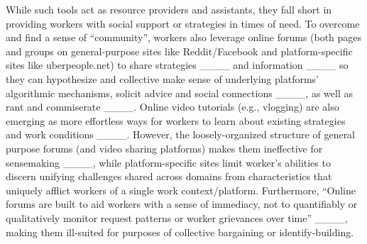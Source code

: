 While such tools act as resource providers and assistants, they {fall short in} provid{ing} workers with social support or strategies in times of need. To overcome  and find a sense of   ``community'',  workers also {}leverage online forums (both {pages and groups on general-purpose sites like Reddit/Facebook} and platform-specific sites like uberpeople.net) to share strategies ____ and information ____ {so they can hypothesize and collective make sense of underlying platforms' algorithmic mechanisms}, solicit advice and social connections ____, as well as rant and commiserate ____.  
Online video tutorials (e.g., vlogging) are also emerging as more effortless ways for workers to learn about existing strategies and work conditions ____.
However, the loosely-organized structure of general purpose forums (and video sharing platforms) {makes them in}effective for sensemaking ____, while platform-specific sites limit {worker's abilities to discern unifying challenges shared across domains from characteristics that uniquely afflict workers of a single work context/platform}.
{Furthermore, ``Online forums are built to aid workers with a sense of immediacy, not to quantifiably or qualitatively monitor
request patterns or worker grievances over time'' ____, making them ill-suited for purposes of collective bargaining or identify-building.}
\vspace{-1mm}

\vspace{-1mm}